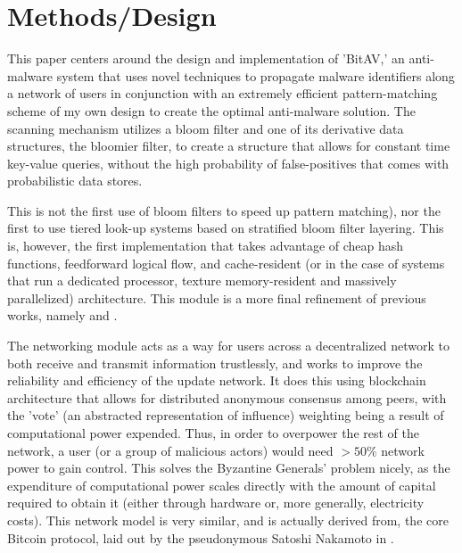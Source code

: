 \documentclass[12pt,journal]{IEEEtran}
\begin{document}
\section{Methods/Design}
This paper centers around the design and implementation of 'BitAV,' an anti-malware system that uses novel techniques to propagate malware identifiers along a network of users in conjunction with an extremely efficient pattern-matching scheme of my own design to create the optimal anti-malware solution. The scanning mechanism utilizes a bloom filter\cite{Bloom1970} and one of its derivative data structures, the bloomier filter\cite{Chazelle2004}, to create a structure that allows for constant time key-value queries, without the high probability of false-positives that comes with probabilistic data stores.\par
This is not the first use of bloom filters to speed up pattern matching\cite{Huang2010,Eppstein2007}), nor the first to use tiered look-up systems based on stratified bloom filter layering\cite{Cha2011,Duy}. This is, however, the first implementation that takes advantage of cheap hash functions, feedforward logical flow, and cache-resident (or in the case of systems that run a dedicated processor, texture memory-resident and massively parallelized) architecture. This module is a more final refinement of previous works, namely \cite{Erdogan2005} and \cite{Cha2011}.\par
The networking module acts as a way for users across a decentralized\cite{Buford2009} network to both receive and transmit information trustlessly, and works to improve the reliability and efficiency of the update network. It does this using blockchain architecture that allows for distributed anonymous consensus among peers, with the 'vote' (an abstracted representation of influence) weighting being a result of computational power expended. Thus, in order to overpower the rest of the network, a user (or a group of malicious actors) would need $> 50\%$ network power to gain control\cite{Reid2011}. This solves the Byzantine Generals' problem nicely, as the expenditure of computational power scales directly with the amount of capital required to obtain it (either through hardware or, more generally, electricity costs)\cite{Kroll2013}. This network model is very similar, and is actually derived from, the core Bitcoin protocol, laid out by the pseudonymous Satoshi Nakamoto in \cite{Nakamoto2008}.
\end{document}
